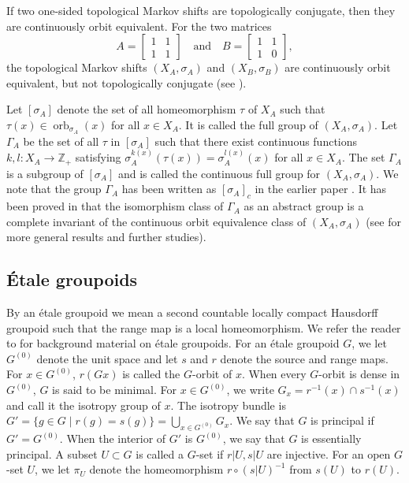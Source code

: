 \documentclass[11pt]{article}
\theoremstyle{definition}
\numberwithin{equation}{section}
\newcommand{\orb}{\operatorname{orb}}
\newcommand{\Z}{\mathbb{Z}}
\begin{document}
If two one-sided topological Markov shifts are topologically conjugate, 
then they are continuously orbit equivalent. 
For the two matrices 
\[
A=\begin{bmatrix}1&1\\1&1\end{bmatrix}\quad\text{and}\quad 
B=\begin{bmatrix}1&1\\1&0\end{bmatrix}, 
\]
the topological Markov shifts $(X_A,\sigma_A)$ and $(X_B,\sigma_B)$ are 
continuously orbit equivalent, 
but not topologically conjugate (see \cite[Section 5]{Matsumoto10PJM}). 

Let $[\sigma_A]$ denote the set of all homeomorphism $\tau$ of $X_A$ 
such that $\tau(x)\in\orb_{\sigma_A}(x)$ for all $x\in X_A$. 
It is called the full group of $(X_A,\sigma_A)$. 
Let $\Gamma_A$ be the set of all $\tau$ in $[\sigma_A]$ 
such that there exist continuous functions $k,l:X_A \to\Z_+$ satisfying 
$\sigma_A^{k(x)}(\tau(x))=\sigma_A^{l(x)}(x)$ for all $x\in X_A$. 
The set $\Gamma_A$ is a subgroup of $[\sigma_A]$ and 
is called the continuous full group for $(X_A,\sigma_A)$. 
We note that the group $\Gamma_A$ has been written as $[\sigma_A]_c$ 
in the earlier paper \cite{Matsumoto10PJM}. 
It has been proved in \cite{Matsumoto12} that 
the isomorphism class of $\Gamma_A$ as an abstract group is 
a complete invariant of the continuous orbit equivalence class 
of $(X_A,\sigma_A)$ 
(see \cite{Matui12} for more general results and further studies). 




\subsection{\'Etale groupoids}




By an \'etale groupoid 
we mean a second countable locally compact Hausdorff groupoid 
such that the range map is a local homeomorphism. 
We refer the reader to \cite{R08Irish} 
for background material on \'etale groupoids. 
For an \'etale groupoid $G$, 
we let $G^{(0)}$ denote the unit space and 
let $s$ and $r$ denote the source and range maps. 
For $x\in G^{(0)}$, 
$r(Gx)$ is called the $G$-orbit of $x$. 
When every $G$-orbit is dense in $G^{(0)}$, $G$ is said to be minimal. 
For $x\in G^{(0)}$, 
we write $G_x=r^{-1}(x)\cap s^{-1}(x)$ and call it the isotropy group of $x$. 
The isotropy bundle is 
$G'=\{g\in G\mid r(g)=s(g)\}=\bigcup_{x\in G^{(0)}}G_x$. 
We say that $G$ is principal if $G'=G^{(0)}$. 
When the interior of $G'$ is $G^{(0)}$, 
we say that $G$ is essentially principal. 
A subset $U\subset G$ is called a $G$-set if $r|U,s|U$ are injective. 
For an open $G$-set $U$, 
we let $\pi_U$ denote the homeomorphism $r\circ(s|U)^{-1}$ 
from $s(U)$ to $r(U)$. 
\end{document}
